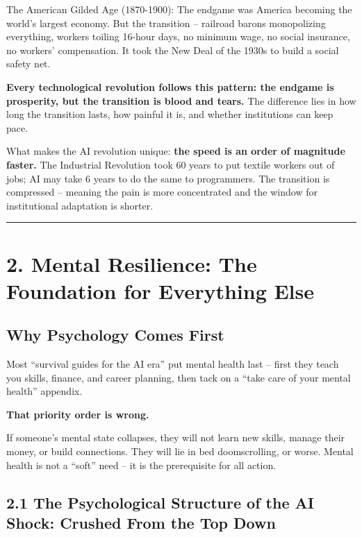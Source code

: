 The American Gilded Age (1870-1900): The endgame was America becoming
the world's largest economy. But the transition -- railroad barons
monopolizing everything, workers toiling 16-hour days, no minimum wage,
no social insurance, no workers' compensation. It took the New Deal of
the 1930s to build a social safety net.

\textbf{Every technological revolution follows this pattern: the endgame
is prosperity, but the transition is blood and tears.} The difference
lies in how long the transition lasts, how painful it is, and whether
institutions can keep pace.

What makes the AI revolution unique: \textbf{the speed is an order of
magnitude faster.} The Industrial Revolution took 60 years to put
textile workers out of jobs; AI may take 6 years to do the same to
programmers. The transition is compressed -- meaning the pain is more
concentrated and the window for institutional adaptation is shorter.

\begin{center}\rule{0.5\linewidth}{0.5pt}\end{center}

\section{2. Mental Resilience: The Foundation for Everything
Else}\label{mental-resilience-the-foundation-for-everything-else}

\subsection{Why Psychology Comes
First}\label{why-psychology-comes-first}

Most ``survival guides for the AI era'' put mental health last -- first
they teach you skills, finance, and career planning, then tack on a
``take care of your mental health'' appendix.

\textbf{That priority order is wrong.}

If someone's mental state collapses, they will not learn new skills,
manage their money, or build connections. They will lie in bed
doomscrolling, or worse. Mental health is not a ``soft'' need -- it is
the prerequisite for all action.

\subsection{2.1 The Psychological Structure of the AI Shock: Crushed
From the Top
Down}\label{the-psychological-structure-of-the-ai-shock-crushed-from-the-top-down}

